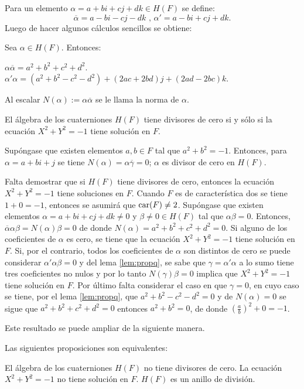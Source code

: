 Para un elemento $\alpha = a + bi + cj + dk \in H(F)$ se define:
\[
\overline{\alpha} = a - bi - cj -dk \mbox{ , } \alpha'= a - bi +cj + dk.
\]
Luego de hacer algunos cálculos sencillos se obtiene:
\begin{lema}\label{lem:propq}
Sea $\alpha \in H(F)$. Entonces:
\begin{bulletList}
\newItem $\alpha\overline{\alpha} = a^2 + b^2 + c^2 + d^2$.
\newItem $\alpha'\alpha = (a^2 + b^2 - c^2 -d^2) + (2ac + 2bd)j + (2ad -2bc)k$.
\end{bulletList}
Al escalar $N(\alpha) := \alpha\overline{\alpha}$ se le llama la norma de $\alpha$.
\end{lema}
\begin{proposicion}
El álgebra de los cuaterniones $H(F)$ tiene divisores de cero si y sólo si la ecuación $X^2 + Y^2 = -1$ tiene solución en $F$.
\end{proposicion}
\begin{proof*}
Supóngase que existen elementos $a,b \in F$ tal que $a^2 + b^2 = -1$. Entonces, para $\alpha = a + bi + j$ se tiene $N(\alpha) = \alpha\overline{\gamma} = 0$; $\alpha$ es divisor de cero en $H(F)$.

Falta demostrar que si $H(F)$ tiene divisores de cero, entonces la ecuación $X^2 + Y^2 = -1$ tiene soluciones en $F$. Cuando $F$ es de característica dos se tiene $1 + 0 = -1$, entonces se asumirá que $\operatorname{car} (F) \neq 2$. Supóngase que existen elementos $\alpha = a + bi + cj + dk \neq 0$ y $\beta \neq 0 \in H(F)$ tal que $\alpha\beta = 0 $. Entonces, $\overline{\alpha}\alpha\beta = N(\alpha)\beta = 0 $ de donde $N(\alpha) = a^2 +b^2 + c^2 + d^2 = 0$. Si alguno de los coeficientes de $\alpha$ es cero, se tiene que la ecuación $X^2 + Y^2 =-1$ tiene solución en $F$. Si, por el contrario, todos los coeficientes de $\alpha$ son distintos de cero se puede considerar $\alpha'\alpha\beta = 0$ y del lema \ref{lem:propq}, se sabe que $\gamma = \alpha'\alpha$ a lo sumo tiene tres coeficientes no nulos y por lo tanto $N(\gamma)\beta = 0$ implica que $X^2 + Y^2 = -1$ tiene solución en $F$. Por último falta considerar el caso en que $\gamma = 0$, en cuyo caso se tiene, por el lema \ref{lem:propq}, que $a^2 + b^2 -c^2 -d^2 = 0 $ y de $N(\alpha) = 0 $ se sigue  que $a^2 + b^2 + c^2 + d^2 = 0 $ entonces $a^2 + b^2 = 0$, de donde $\left( \frac{a}{b} \right)^2 + 0 = -1$.
\end{proof*}
Este resultado se puede ampliar de la siguiente manera.
\begin{proposicion}
Las siguientes proposiciones son equivalentes:
\begin{bulletList}
\newItem El álgebra de los cuaterniones $H(F)$ no tiene divisores de cero.
\newItem La ecuación $X^2 + Y^2 = -1$ no tiene solución en $F$.
\newItem $H(F)$ es un anillo de división.
\end{bulletList}
\end{proposicion}

